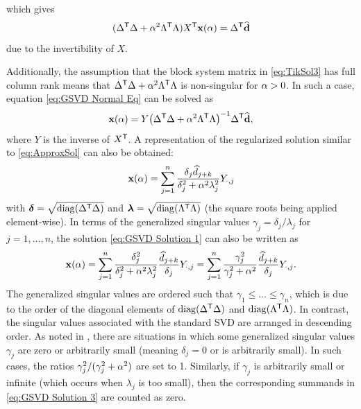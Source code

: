 \documentclass[12pt]{article}
\begin{document}
which gives 
\begin{equation}
    \label{eq:GSVD Normal Eq}
    ({\Delta}^\mathsf{T}\Delta + \alpha^2 {\Lambda}^\mathsf{T}\Lambda){X}^\mathsf{T}\mathbf{x}(\alpha) = {\Delta}^\mathsf{T}\widehat{\mathbf{d}}
\end{equation}
due to the invertibility of $X$. \par
Additionally, the assumption that the block system matrix in \eqref{eq:TikSol3} has full column rank means that ${\Delta}^\mathsf{T}\Delta + \alpha^2 {\Lambda}^\mathsf{T}\Lambda$ is non-singular for $\alpha > 0$. In such a case, equation \eqref{eq:GSVD Normal Eq} can be solved as
\begin{equation}
    \label{eq:GSVD Normal Eq Sol}
    \mathbf{x}(\alpha) = Y{\left({\Delta}^\mathsf{T}\Delta + \alpha^2 {\Lambda}^\mathsf{T}\Lambda\right)}^{-1}{\Delta}^\mathsf{T}\widehat{\mathbf{d}},
\end{equation}
where $Y$ is the inverse of ${X}^\mathsf{T}$. A representation of the regularized solution similar to \eqref{eq:ApproxSol} can also be obtained:
\begin{equation}
\label{eq:GSVD Solution 1}
\mathbf{x}(\alpha) = \sum_{j = 1}^{n} \frac{\delta_j \widehat{d}_{j+k}}{\delta^2_j + \alpha^2 \lambda^2_j}Y_{\cdot,j}
\end{equation}
with $\bm{\delta} = \sqrt{\operatorname{diag}({\Delta}^\mathsf{T}\Delta)}$ and $\bm{\lambda} = \sqrt{\operatorname{diag}({\Lambda}^\mathsf{T}\Lambda)}$ (the square roots being applied element-wise).  In terms of the generalized singular values $\gamma_j = \delta_j/\lambda_j$ for $j = 1,\ldots,n$, the solution \eqref{eq:GSVD Solution 1} can also be written as
\begin{equation}
\label{eq:GSVD Solution 3}
\mathbf{x}(\alpha) = \sum_{j = 1}^{n} \frac{\delta_j^2}{\delta^2_j + \alpha^2 \lambda^2_j} \frac{\widehat{d}_{j+k}}{\delta_j} Y_{\cdot,j} = \sum_{j = 1}^{n} \frac{\gamma_j^2}{\gamma^2_j + \alpha^2} \frac{\widehat{d}_{j+k}}{\delta_j} Y_{\cdot,j}.
\end{equation}
The generalized singular values are ordered such that $\gamma_1 \leq \ldots \leq \gamma_n$, which is due to the order of the diagonal elements of $\operatorname{diag}({\Delta}^\mathsf{T}\Delta)$ and $\operatorname{diag}({\Lambda}^\mathsf{T}\Lambda)$. In contrast, the singular values associated with the standard SVD are arranged in descending order. As noted in \cite[p.~107]{ABT}, there are situations in which some generalized singular values $\gamma_j$ are zero or arbitrarily small (meaning $\delta_j = 0$ or is arbitrarily small). In such cases, the ratios $\gamma_j^2/(\gamma_j^2 + \alpha^2)$ are set to 1. Similarly, if $\gamma_j$ is arbitrarily small or infinite (which occurs when $\lambda_j$ is too small), then the corresponding summands in \eqref{eq:GSVD Solution 3} are counted as zero. \par
\end{document}
